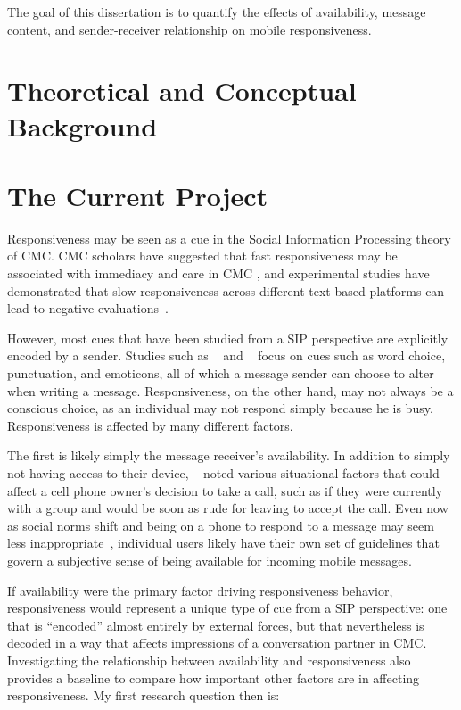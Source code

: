 \documentclass[12pt]{nuthesis}	%
\begin{document}
The goal of this dissertation is to quantify the effects of availability, message content, and sender-receiver relationship on mobile responsiveness. 

\chapter{Theoretical and Conceptual Background}

\chapter{The Current Project}

Responsiveness may be seen as a cue in the Social Information Processing theory of CMC. CMC scholars have suggested that fast responsiveness may be associated with immediacy and care in CMC \citep{kalman2006pauses,walther1995nonverbal}, and experimental studies have demonstrated that slow responsiveness across different text-based platforms can lead to negative evaluations~\citep{heston2017worth,kalman2011online}.

However, most cues that have been studied from a SIP perspective are explicitly encoded by a sender. Studies such as ~\citet{hancock2007expressing} and ~\citet{pirzadeh2012expression} focus on cues such as word choice, punctuation, and emoticons, all of which a message sender can choose to alter when writing a message. Responsiveness, on the other hand, may not always be a conscious choice, as an individual may not respond simply because he is busy. Responsiveness is affected by many different factors.

The first is likely simply the message receiver's availability. In addition to simply not having access to their device, ~\citet{avrahami2007improving} noted various situational factors that could affect a cell phone owner's decision to take a call, such as if they were currently with a group and would be soon as rude for leaving to accept the call. Even now as social norms shift and being on a phone to respond to a message may seem less inappropriate~\citep{rainie2015americans}, individual users likely have their own set of guidelines that govern a subjective sense of being available for incoming mobile messages.

If availability were the primary factor driving responsiveness behavior, responsiveness would represent a unique type of cue from a SIP perspective: one that is ``encoded'' almost entirely by external forces, but that nevertheless is decoded in a way that affects impressions of a conversation partner in CMC. Investigating the relationship between availability and responsiveness also provides a baseline to compare how important other factors are in affecting responsiveness. My first research question then is:
\end{document}
